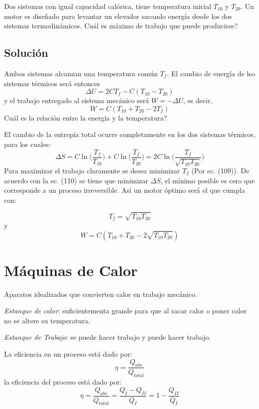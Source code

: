 \documentclass[10pt,twocolumn]{IEEEtran2e}
\begin{document}
Dos sistemas con igual capacidad cal\'orica, tiene temperatura inicial $T_{10}$ y $T_{20}$. Un motor es dise\~nado para levantar un elevador sacando energ\'ia desde los dos sistemas termodin\'amicos. \textquestiondown Cu\'al es m\'aximo de trabajo que puede producirse?

\subsection*{Soluci\'on}
Ambos sistemas alcanzan una temperatura com\'un $T_{f}$. El cambio de energ\'ia de lso sistemas t\'ermicos ser\'a entonces
\begin{equation}
 \Delta U=2CT_{f}-C(T_{10}-T_{20})
\end{equation}
y el trabajo entregado al sistema mec\'anico ser\'a $W=-\Delta U$, es decir,
\begin{equation}
 W = C(T_{10}+T_{20}-2T_{f})
\end{equation}
Cu\'al es la relaci\'on entre la energ\'ia y la temperatura?



El cambio de la entrop\'ia total ocurre completamente en los dos sistemas t\'ermicos, para los cuales:
\begin{equation}
 \Delta S = C \ln \bigg(\frac{T_{f}}{T_{10}}\bigg) + C \ln \bigg(\frac{T_{f}}{T_{20}}\bigg)=2C\ln \bigg(\frac{T_{f}}{\sqrt{T_{10}T_{20}}}\bigg)
\end{equation}
Para maximizar el trabajo claramente se desea minimizar $T_{f}$ (Por ec. (109)). De acuerdo con la ec. (110) se tiene que minimizar $\Delta S$, el m\'inimo posible es cero que corresponde a un proceso irreversible. As\'i un motor \'optimo ser\'a el que cumpla con:

\begin{equation}
 T_{f}=\sqrt{T_{10}T_{20}}
\end{equation}
y
\begin{equation}
W=C(T_{10}+T_{20}-2\sqrt{T_{10}T_{20}}) 
\end{equation}


\section{M\'aquinas de Calor}
Aparatos idealizados que convierten calor en trabajo mec\'anico.
\begin{description}
 \item \textit{Estanque de calor}: suficientementa grande para que al sacar calor o poner calor no se altere su temperatura.
 \item \textit{Estanque de Trabajo}: se puede hacer trabajo y puede hacer trabajo.
\end{description}
La eficiencia en un proceso est\'a dado por:
\begin{equation}
 \eta = \frac{Q_{abs}}{Q_{total}}
\end{equation}
la eficiencia del proceso est\'a dado por:
\begin{equation}
 \eta = \frac{Q_{abs}}{Q_{total}}=\frac{Q_{I}-Q_{II}}{Q_{I}}=1-\frac{Q_{II}}{Q_{I}}
\end{equation}
\end{document}

